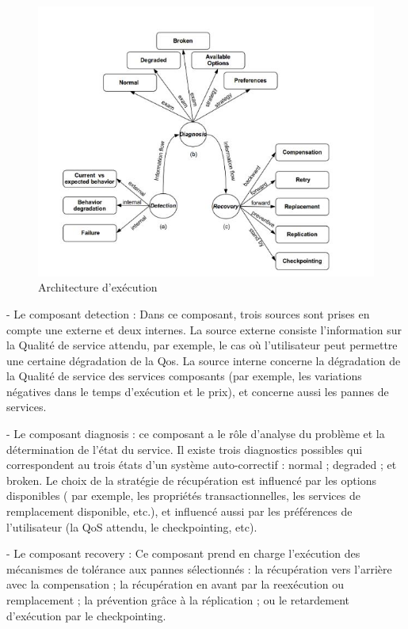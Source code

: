 \begin{figure}[H]
\begin{center}
\includegraphics[width=1\linewidth]{images/Boucleauto-correctivedesAgentsdeService.jpg}
\end{center}
\caption{Architecture d'exécution \cite{1}}
\label{fig:5}
\end{figure}

- Le composant detection : Dans ce composant, trois sources sont prises en compte une externe et deux internes. 
La source externe consiste l'information sur la Qualité de service attendu, par exemple, le cas où l'utilisateur peut permettre une certaine dégradation de la Qos.
La source interne concerne la dégradation de la Qualité de service des services composants (par exemple, les variations négatives dans le temps d'exécution et le prix), et concerne aussi les pannes de services.

- Le composant diagnosis : ce composant a le rôle d'analyse du problème et la détermination de l'état du service.
Il existe trois diagnostics possibles qui correspondent au trois états d'un système auto-correctif : normal ; degraded ; et broken. Le choix de la stratégie de récupération est influencé par les options disponibles ( par exemple, les propriétés transactionnelles, les services de remplacement disponible, etc.), et influencé aussi par les préférences de l'utilisateur (la QoS attendu, le checkpointing, etc).

- Le composant recovery :  Ce composant prend en charge l'exécution des mécanismes de tolérance aux pannes sélectionnés : la récupération vers l'arrière avec la compensation ; la récupération en avant par la reexécution ou remplacement ; la prévention grâce à la réplication ; ou le retardement d'exécution par le checkpointing.



